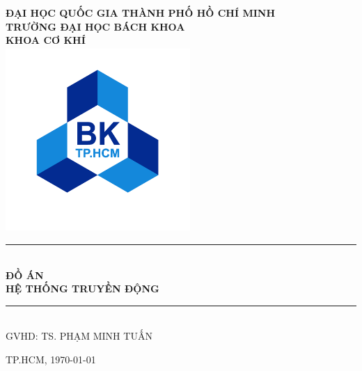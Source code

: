 \begin{titlepage}   
    \begin{center}
        \vspace*{-2cm} 
        \large
        \textbf{ĐẠI HỌC QUỐC GIA THÀNH PHỐ HỒ CHÍ MINH \\
        TRƯỜNG ĐẠI HỌC BÁCH KHOA\\
        KHOA CƠ KHÍ\\}
        \vspace{0.5cm}
        \includegraphics[width=70mm, height=70mm]{pictures/hcmut.png} \\
        \rule{\linewidth}{0.5mm}\\
        \vspace{1cm}
        \LARGE
        \textbf{ĐỒ ÁN}\\                                                                                                                                                                                                                    
        \vspace*{0.5cm}
        \Huge
        \textbf{HỆ THỐNG TRUYỀN ĐỘNG}\\                                                                                                                                                                                                                                                                                                                                                                                                                                             
        \vspace{0.5cm}
        \rule{\linewidth}{0.5mm}\\
        \vspace{0.8cm}
        \vspace{1cm}
        \large
        GVHD: TS. PHẠM MINH TUẤN\\[0.5cm]
    \end{center}
        
    \vfill
    \large
    \begin{center}
        TP.HCM, \today
    \end{center}
\end{titlepage}